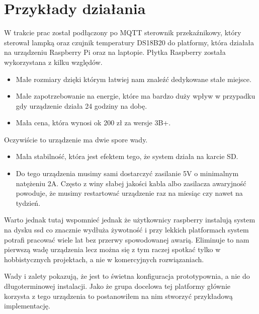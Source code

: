 \chapter{Przykłady działania}
W trakcie prac został podłączony po MQTT sterownik przekaźnikowy, który sterował lampką oraz czujnik temperatury DS18B20 do platformy, która działała na urządzeniu Raspberry Pi oraz na laptopie. Płytka Raspberry została wykorzystana z kilku względów. 
\begin{itemize}
    \item Małe rozmiary dzięki którym łatwiej nam znaleźć dedykowane stałe miejsce.
    \item Małe zapotrzebowanie na energie, które ma bardzo duży wpływ w przypadku gdy urządzenie działa 24 godziny na dobę.
    \item Mała cena, która wynosi ok 200 zł za wersje 3B+.
\end{itemize}
Oczywiście to urządzenie ma dwie spore wady.
\begin{itemize}
    \item Mała stabilność, która jest efektem tego, że system działa na karcie SD.
    \item Do tego urządzenia musimy sami dostarczyć zasilanie 5V o minimalnym natężeniu 2A. Często z winy słabej jakości kabla albo zasilacza awaryjność powoduje, że musimy restartować urządzenie raz na miesiąc czy nawet na tydzień.
\end{itemize}
Warto jednak tutaj wspomnieć jednak że użytkownicy raspberry instalują system na dysku ssd co znacznie wydłuża żywotność i przy lekkich platformach system potrafi pracować wiele lat bez przerwy spowodowanej awarią. Eliminuje to nam pierwszą wadę urządzenia lecz można się z tym raczej spotkać tylko w hobbistycznych projektach, a nie w komercyjnych rozwiązaniach.
\par
Wady i zalety pokazują, że jest to świetna konfiguracja prototypownia, a nie do długoterminowej instalacji. Jako że grupa docelowa tej platformy głównie korzysta z tego urządzenia to postanowiłem na nim stworzyć przykładową implementację.
\newpage
